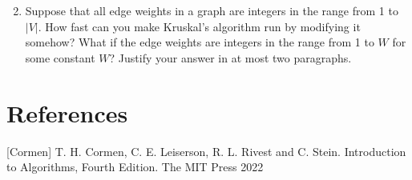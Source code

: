 \documentclass[10pt]{article}
\begin{document}
\begin{enumerate}
  \setcounter{enumi}{1}
  \item Suppose that all edge weights in a graph are integers in the range from 1 to $|V|$. How fast can you make Kruskal's algorithm run by modifying it somehow? What if the edge weights are integers in the range from 1 to $W$ for some constant $W$? Justify your answer in at most two paragraphs.
\end{enumerate}

\section*{References}
[Cormen] T. H. Cormen, C. E. Leiserson, R. L. Rivest and C. Stein. Introduction to Algorithms, Fourth Edition. The MIT Press 2022
\end{document}
